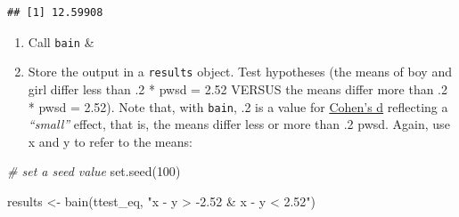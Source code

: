 \documentclass[
]{book}
\newenvironment{Shaded}{\begin{snugshade}}{\end{snugshade}}
\newcommand{\CommentTok}[1]{\textcolor[rgb]{0.56,0.35,0.01}{\textit{#1}}}
\newcommand{\DecValTok}[1]{\textcolor[rgb]{0.00,0.00,0.81}{#1}}
\newcommand{\FunctionTok}[1]{\textcolor[rgb]{0.00,0.00,0.00}{#1}}
\newcommand{\NormalTok}[1]{#1}
\newcommand{\OtherTok}[1]{\textcolor[rgb]{0.56,0.35,0.01}{#1}}
\newcommand{\SpecialCharTok}[1]{\textcolor[rgb]{0.00,0.00,0.00}{#1}}
\newcommand{\StringTok}[1]{\textcolor[rgb]{0.31,0.60,0.02}{#1}}
\begin{document}
\begin{Shaded}
\end{Shaded}

\begin{verbatim}
## [1] 12.59908
\end{verbatim}

\begin{enumerate}
\def\labelenumi{\arabic{enumi})}
\setcounter{enumi}{1}
\item
  Call \texttt{bain} \&
\item
  Store the output in a \texttt{results} object.
  Test hypotheses (the means of boy and girl differ less than .2 * pwsd =
  2.52 VERSUS the means differ more than .2 * pwsd = 2.52).
  Note that, with \texttt{bain}, .2 is a value for \href{https://en.wikiversity.org/wiki/Cohen\%27s_d\#:~:text=Cohen's\%20d\%20is\%20an\%20effect,the\%20comparison\%20between\%20two\%20means.}{Cohen's d} reflecting a \emph{``small''} effect, that
  is, the means differ less or more than .2 pwsd. Again, use x and y to refer to the means:
\end{enumerate}

\begin{Shaded}
\begin{Highlighting}[]
\CommentTok{\# set a seed value}
\FunctionTok{set.seed}\NormalTok{(}\DecValTok{100}\NormalTok{)}

\NormalTok{results }\OtherTok{\textless{}{-}} \FunctionTok{bain}\NormalTok{(ttest\_eq, }\StringTok{"x {-} y \textgreater{} {-}2.52 \& x {-} y \textless{} 2.52"}\NormalTok{)}
\end{Highlighting}
\end{Shaded}
\end{document}
